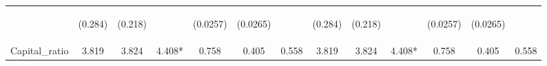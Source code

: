 \documentclass[]{article}
\begin{document}
\begin{center}
\begin{tabular}{lcccccccccccc}
\vspace{4pt} & \begin{footnotesize}(0.284)\end{footnotesize} & \begin{footnotesize}(0.218)\end{footnotesize} & \begin{footnotesize}\end{footnotesize} & \begin{footnotesize}(0.0257)\end{footnotesize} & \begin{footnotesize}(0.0265)\end{footnotesize} & \begin{footnotesize}\end{footnotesize} & \begin{footnotesize}(0.284)\end{footnotesize} & \begin{footnotesize}(0.218)\end{footnotesize} & \begin{footnotesize}\end{footnotesize} & \begin{footnotesize}(0.0257)\end{footnotesize} & \begin{footnotesize}(0.0265)\end{footnotesize} & \begin{footnotesize}\end{footnotesize} \\
Capital\_ratio & 3.819 & 3.824 & 4.408* & 0.758 & 0.405 & 0.558 & 3.819 & 3.824 & 4.408* & 0.758 & 0.405 & 0.558 \\

\end{tabular}
\end{center}
\end{document}
